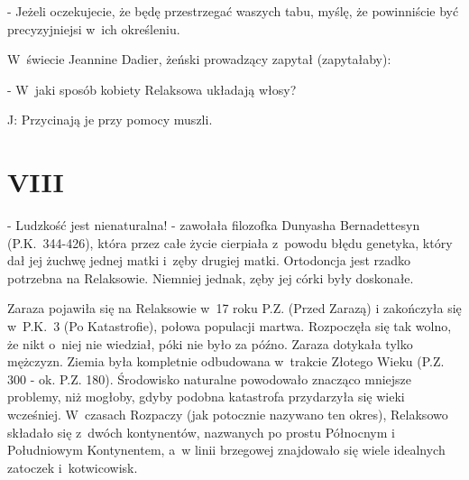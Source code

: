 \documentclass[oneside,polish,12pt,sfheadings]{mwbk}
\begin{document}
- Jeżeli oczekujecie, że będę przestrzegać waszych tabu,
myślę, że powinniście być precyzyjniejsi w~ich określeniu. 

W~świecie
Jeannine Dadier, żeński prowadzący zapytał (zapytałaby): 

- W~jaki sposób kobiety Relaksowa układają włosy?

J: Przycinają je przy pomocy muszli.

\chapter{VIII}

- Ludzkość jest nienaturalna! - zawołała filozofka Dunyasha Bernadettesyn
(P.K.~344-426), która przez całe życie cierpiała z~powodu błędu genetyka,
który dał jej żuchwę jednej matki i~zęby drugiej matki. Ortodoncja
jest rzadko potrzebna na Relaksowie. Niemniej jednak, zęby jej córki
były doskonałe.

Zaraza pojawiła się na Relaksowie w~17 roku P.Z. (Przed Zarazą) i
zakończyła się w~P.K.~3 (Po Katastrofie), połowa populacji martwa. Rozpoczęła się tak wolno, że nikt o~niej nie wiedział, póki nie było za późno. Zaraza dotykała tylko mężczyzn.
Ziemia była kompletnie odbudowana w~trakcie Złotego Wieku (P.Z. 300
- ok. P.Z. 180). Środowisko naturalne powodowało znacząco mniejsze
problemy, niż mogłoby, gdyby podobna katastrofa przydarzyła się wieki
wcześniej. W~czasach Rozpaczy (jak potocznie nazywano ten okres),
Relaksowo składało się z~dwóch kontynentów, nazwanych po prostu Północnym
i Południowym Kontynentem, a~w linii brzegowej znajdowało się wiele
idealnych zatoczek i~kotwicowisk.
\end{document}

